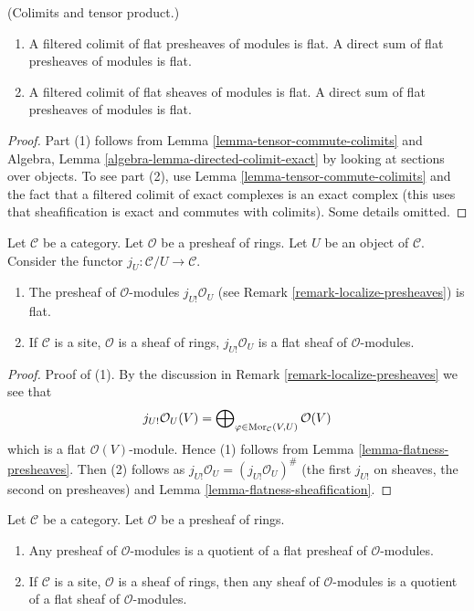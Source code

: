 \begin{lemma}
\label{lemma-colimits-flat}
(Colimits and tensor product.)
\begin{enumerate}
\item A filtered colimit of flat presheaves of modules
is flat. A direct sum of flat presheaves of modules is flat.
\item A filtered colimit of flat sheaves of modules is flat.
A direct sum of flat presheaves of modules is flat.
\end{enumerate}
\end{lemma}

\begin{proof}
Part (1) follows from Lemma \ref{lemma-tensor-commute-colimits} and
Algebra, Lemma \ref{algebra-lemma-directed-colimit-exact}
by looking at sections over objects.
To see part (2), use Lemma \ref{lemma-tensor-commute-colimits} and
the fact that a filtered colimit of exact
complexes is an exact complex (this uses that sheafification is exact
and commutes with colimits). Some details omitted.
\end{proof}

\begin{lemma}
\label{lemma-j-shriek-flat}
Let $\mathcal{C}$ be a category.
Let $\mathcal{O}$ be a presheaf of rings.
Let $U$ be an object of $\mathcal{C}$.
Consider the functor $j_U : \mathcal{C}/U \to \mathcal{C}$.
\begin{enumerate}
\item The presheaf of $\mathcal{O}$-modules
$j_{U!}\mathcal{O}_U$ (see
Remark \ref{remark-localize-presheaves})
is flat.
\item If $\mathcal{C}$ is a site, $\mathcal{O}$ is a sheaf of rings,
$j_{U!}\mathcal{O}_U$ is a flat sheaf of $\mathcal{O}$-modules.
\end{enumerate}
\end{lemma}

\begin{proof}
Proof of (1). By the discussion in
Remark \ref{remark-localize-presheaves}
we see that
$$
j_{U!}\mathcal{O}_U(V)
=
\bigoplus\nolimits_{\varphi \in \mathop{\rm Mor}\nolimits_\mathcal{C}(V, U)}
\mathcal{O}(V)
$$
which is a flat $\mathcal{O}(V)$-module. Hence (1) follows from
Lemma \ref{lemma-flatness-presheaves}.
Then (2) follows as $j_{U!}\mathcal{O}_U = (j_{U!}\mathcal{O}_U)^\#$
(the first $j_{U!}$ on sheaves, the second on presheaves)
and Lemma \ref{lemma-flatness-sheafification}.
\end{proof}

\begin{lemma}
\label{lemma-module-quotient-flat}
Let $\mathcal{C}$ be a category.
Let $\mathcal{O}$ be a presheaf of rings.
\begin{enumerate}
\item Any presheaf of $\mathcal{O}$-modules is a quotient of
a flat presheaf of $\mathcal{O}$-modules.
\item If $\mathcal{C}$ is a site, $\mathcal{O}$ is a sheaf of rings,
then any sheaf of $\mathcal{O}$-modules is a quotient of
a flat sheaf of $\mathcal{O}$-modules.
\end{enumerate}
\end{lemma}

